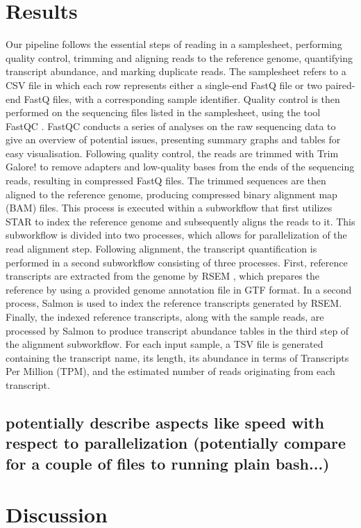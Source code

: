 \documentclass{article}
\theoremstyle{plain}
\theoremstyle{definition}
\theoremstyle{remark}
\begin{document}
\section{Results}
Our pipeline follows the essential steps of reading in a samplesheet, performing quality control, trimming and aligning reads to the reference genome, quantifying transcript abundance, and marking duplicate reads.
The samplesheet refers to a CSV file in which each row represents either a single-end FastQ file or two paired-end FastQ files, with a corresponding sample identifier.
Quality control is then performed on the sequencing files listed in the samplesheet, using the tool FastQC \cite{fastqc}. FastQC conducts a series of analyses on the raw sequencing data to give an overview of potential issues, presenting summary graphs and tables for easy visualisation.
Following quality control, the reads are trimmed with Trim Galore! \cite{trimgalore} to remove adapters and low-quality bases from the ends of the sequencing reads, resulting in compressed FastQ files.
The trimmed sequences are then aligned to the reference genome, producing compressed binary alignment map (BAM) files. This process is executed within a subworkflow that first utilizes STAR \cite{Dobin2012} to index the reference genome and subsequently aligns the reads to it. This subworkflow is divided into two processes, which allows for parallelization of the read alignment step.
Following alignment, the transcript quantification is performed in a second subworkflow consisting of three processes. First, reference transcripts are extracted from the genome by RSEM \cite{Li2011}, which prepares the reference by using a provided genome annotation file in GTF format.
In a second process, Salmon \cite{Patro2017} is used to index the reference transcripts generated by RSEM. Finally, the indexed reference transcripts, along with the sample reads, are processed by Salmon to produce transcript abundance tables in the third step of the alignment subworkflow. For each input sample, a TSV file is generated containing the transcript name, its length, its abundance in terms of Transcripts Per Million (TPM), and the estimated number of reads originating from each transcript.

\subsection{potentially describe aspects like speed with respect to parallelization (potentially compare for a couple of files to running plain bash...)}
\section{Discussion}
\end{document}
